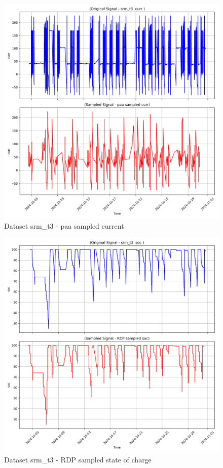 \begin{figure}
    \centering
    \includegraphics[width=1\linewidth]{screenshots/srm_t3/paa_sampled_curr_screenshot.png}
    \caption{Dataset srm\_t3 - paa sampled current }
    \label{fig:srm_t3_paa_sampled_curr_screenshot}
\end{figure}
\begin{figure}
    \centering
    \includegraphics[width=1\linewidth]{screenshots/srm_t3/RDP_sampled_soc_screenshot.png}
    \caption{Dataset srm\_t3 - RDP sampled state of charge }
    \label{fig:srm_t3_RDP_sampled_soc_screenshot}
\end{figure}

